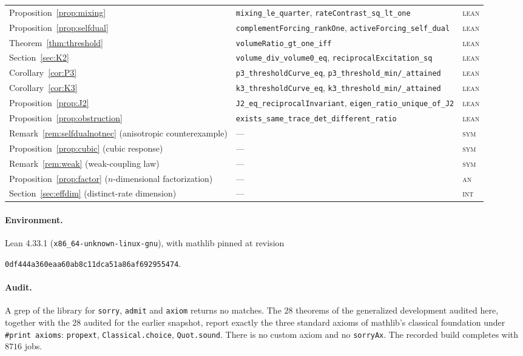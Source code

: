 \documentclass[11pt]{article}
\theoremstyle{plain}
\theoremstyle{definition}
\theoremstyle{remark}
\begin{document}
\begin{table}[!tbp]
\begin{tabular}{@{}l >{\raggedright\arraybackslash}p{} l@{}}
Proposition~\ref{prop:mixing} & \texttt{mixing\_le\_quarter}, \texttt{rateContrast\_sq\_lt\_one} & \textsc{lean}\\
Proposition~\ref{prop:selfdual} & \texttt{complementForcing\_rankOne}, \texttt{activeForcing\_self\_dual} & \textsc{lean}\\
Theorem~\ref{thm:threshold} & \texttt{volumeRatio\_gt\_one\_iff} & \textsc{lean}\\
Section~\ref{sec:K2} & \texttt{volume\_div\_volume0\_eq}, \texttt{reciprocalExcitation\_sq} & \textsc{lean}\\
Corollary~\ref{cor:P3} & \texttt{p3\_thresholdCurve\_eq}, \texttt{p3\_threshold\_min/\_attained} & \textsc{lean}\\
Corollary~\ref{cor:K3} & \texttt{k3\_thresholdCurve\_eq}, \texttt{k3\_threshold\_min/\_attained} & \textsc{lean}\\
Proposition~\ref{prop:J2} & \texttt{J2\_eq\_reciprocalInvariant}, \texttt{eigen\_ratio\_unique\_of\_J2} & \textsc{lean}\\
Proposition~\ref{prop:obstruction} & \texttt{exists\_same\_trace\_det\_different\_ratio} & \textsc{lean}\\
\midrule
Remark~\ref{rem:selfdualnotnec} (anisotropic counterexample) & --- & \textsc{sym}\\
Proposition~\ref{prop:cubic} (cubic response) & --- & \textsc{sym}\\
Remark~\ref{rem:weak} (weak-coupling law) & --- & \textsc{sym}\\
Proposition~\ref{prop:factor} ($n$-dimensional factorization) & --- & \textsc{an}\\
Section~\ref{sec:effdim} (distinct-rate dimension) & --- & \textsc{int}\\
\bottomrule
\end{tabular}
\end{table}

\paragraph{Environment.} Lean 4.33.1 (\texttt{x86\_64-unknown-linux-gnu}), with mathlib pinned at
revision
\begin{center}
\texttt{0df444a360eaa60ab8c11dca51a86af692955474}.
\end{center}

\paragraph{Audit.} A grep of the library for \texttt{sorry}, \texttt{admit} and \texttt{axiom}
returns no matches. The $28$ theorems of the generalized development audited here, together with
the $28$ audited for the earlier snapshot, report exactly the three standard axioms of mathlib's
classical foundation under \texttt{\#print axioms}: \texttt{propext}, \texttt{Classical.choice},
\texttt{Quot.sound}. There is no custom axiom and no \texttt{sorryAx}. The recorded build
completes with $8716$ jobs.
\end{document}
